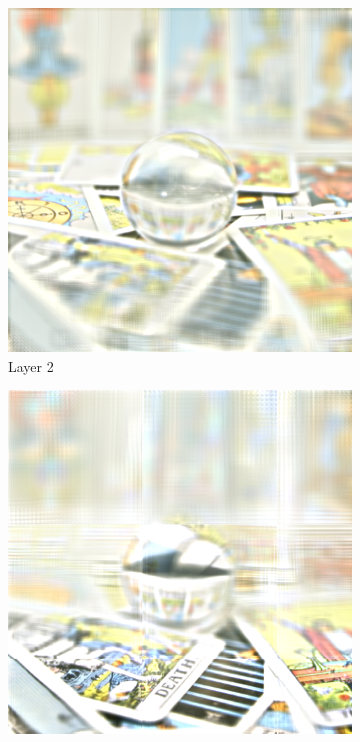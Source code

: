 \begin{figure}[tb]
\begin{subfigure}{0.23\textwidth}
		\vspace{0.15cm}
		
		\includegraphics[width = \textwidth]{../Figures/tiling/tarot_tiles5x5x200x200_overlap0.5_3_layers/2.png}
		\caption{Layer 2}
	\end{subfigure}\hspace{0.15cm}%
	\begin{subfigure}{0.23\textwidth}
		\includegraphics[width = \textwidth]{../Figures/tiling/tarot_tiles3x3x200x200_no_overlap_3_layers/3.png}
		

\end{subfigure}
\end{figure}
